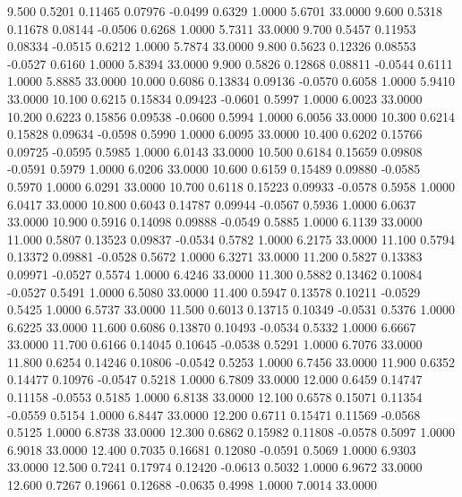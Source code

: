    9.500   0.5201   0.11465   0.07976  -0.0499   0.6329   1.0000   5.6701  33.0000
   9.600   0.5318   0.11678   0.08144  -0.0506   0.6268   1.0000   5.7311  33.0000
   9.700   0.5457   0.11953   0.08334  -0.0515   0.6212   1.0000   5.7874  33.0000
   9.800   0.5623   0.12326   0.08553  -0.0527   0.6160   1.0000   5.8394  33.0000
   9.900   0.5826   0.12868   0.08811  -0.0544   0.6111   1.0000   5.8885  33.0000
  10.000   0.6086   0.13834   0.09136  -0.0570   0.6058   1.0000   5.9410  33.0000
  10.100   0.6215   0.15834   0.09423  -0.0601   0.5997   1.0000   6.0023  33.0000
  10.200   0.6223   0.15856   0.09538  -0.0600   0.5994   1.0000   6.0056  33.0000
  10.300   0.6214   0.15828   0.09634  -0.0598   0.5990   1.0000   6.0095  33.0000
  10.400   0.6202   0.15766   0.09725  -0.0595   0.5985   1.0000   6.0143  33.0000
  10.500   0.6184   0.15659   0.09808  -0.0591   0.5979   1.0000   6.0206  33.0000
  10.600   0.6159   0.15489   0.09880  -0.0585   0.5970   1.0000   6.0291  33.0000
  10.700   0.6118   0.15223   0.09933  -0.0578   0.5958   1.0000   6.0417  33.0000
  10.800   0.6043   0.14787   0.09944  -0.0567   0.5936   1.0000   6.0637  33.0000
  10.900   0.5916   0.14098   0.09888  -0.0549   0.5885   1.0000   6.1139  33.0000
  11.000   0.5807   0.13523   0.09837  -0.0534   0.5782   1.0000   6.2175  33.0000
  11.100   0.5794   0.13372   0.09881  -0.0528   0.5672   1.0000   6.3271  33.0000
  11.200   0.5827   0.13383   0.09971  -0.0527   0.5574   1.0000   6.4246  33.0000
  11.300   0.5882   0.13462   0.10084  -0.0527   0.5491   1.0000   6.5080  33.0000
  11.400   0.5947   0.13578   0.10211  -0.0529   0.5425   1.0000   6.5737  33.0000
  11.500   0.6013   0.13715   0.10349  -0.0531   0.5376   1.0000   6.6225  33.0000
  11.600   0.6086   0.13870   0.10493  -0.0534   0.5332   1.0000   6.6667  33.0000
  11.700   0.6166   0.14045   0.10645  -0.0538   0.5291   1.0000   6.7076  33.0000
  11.800   0.6254   0.14246   0.10806  -0.0542   0.5253   1.0000   6.7456  33.0000
  11.900   0.6352   0.14477   0.10976  -0.0547   0.5218   1.0000   6.7809  33.0000
  12.000   0.6459   0.14747   0.11158  -0.0553   0.5185   1.0000   6.8138  33.0000
  12.100   0.6578   0.15071   0.11354  -0.0559   0.5154   1.0000   6.8447  33.0000
  12.200   0.6711   0.15471   0.11569  -0.0568   0.5125   1.0000   6.8738  33.0000
  12.300   0.6862   0.15982   0.11808  -0.0578   0.5097   1.0000   6.9018  33.0000
  12.400   0.7035   0.16681   0.12080  -0.0591   0.5069   1.0000   6.9303  33.0000
  12.500   0.7241   0.17974   0.12420  -0.0613   0.5032   1.0000   6.9672  33.0000
  12.600   0.7267   0.19661   0.12688  -0.0635   0.4998   1.0000   7.0014  33.0000
